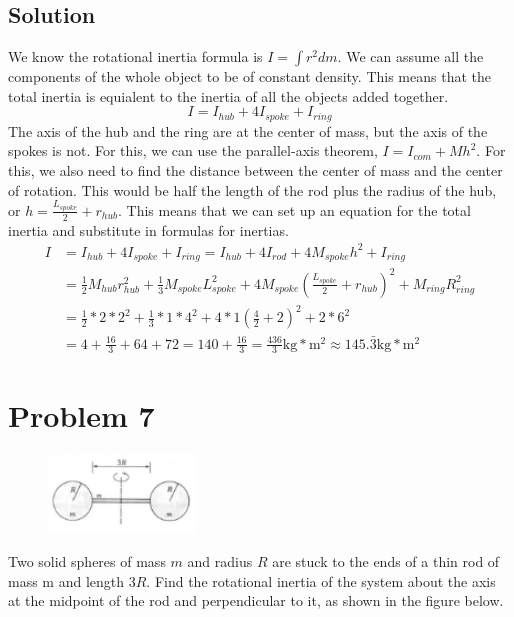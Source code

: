 \documentclass[12pt]{article}
\begin{document}
\subsection*{Solution}
We know the rotational inertia formula is \(I = \int r^2 dm\). We can assume all the components of the whole object to be of constant density. This means that the total inertia is equialent to the inertia of all the objects added together.
\[ I = I_{hub} + 4 I_{spoke} + I_{ring} \]
The axis of the hub and the ring are at the center of mass, but the axis of the spokes is not. For this, we can use the parallel-axis theorem, \(I = I_{com} + Mh^2\). For this, we also need to find the distance between the center of mass and the center of rotation. This would be half the length of the rod plus the radius of the hub, or \(h = \frac{L_{spoke}}{2} + r_{hub}\). This means that we can set up an equation for the total inertia and substitute in formulas for inertias.
\begin{align*}
    I   &=  I_{hub} + 4 I_{spoke} + I_{ring}
        =   I_{hub} + 4 I_{rod} + 4M_{spoke}h^2 + I_{ring}\\
        &=  \frac{1}{2}M_{hub}r_{hub}^2 + \frac{1}{3}M_{spoke}L_{spoke}^2 + 4M_{spoke}\left(\frac{L_{spoke}}{2} + r_{hub}\right)^2 + M_{ring}R_{ring}^2\\
        &=  \frac{1}{2}*2*2^2 + \frac{1}{3}*1*4^2 + 4*1\left(\frac{4}{2} + 2\right)^2 + 2*6^2\\
        &=  4 + \frac{16}{3} + 64 + 72
        =   140+\frac{16}{3}
        =   \boxed{\frac{436}{3} \unit{\kilo\gram*\meter^2} \approx 145.\bar{3} \unit{\kilo\gram*\meter^2}}
\end{align*}


\pagebreak
\section*{Problem 7}
\begin{figure}
    \vspace{-30pt}
    \includegraphics[width=0.35\textwidth]{graph_7.png} 
\end{figure}
Two solid spheres of mass $m$ and radius $R$ are stuck to the ends of a thin rod of mass m and
length $3R$. Find the rotational inertia of the system about the axis at the midpoint of the rod and
perpendicular to it, as shown in the figure below.
\end{document}

